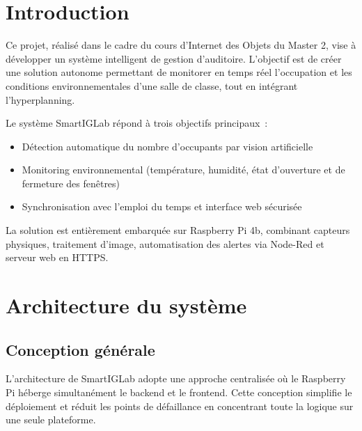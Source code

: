 \documentclass[a4paper,12pt]{report}
\begin{document}
\umonsCoverPage

\cleardoublepage
{}
\vspace{1cm}

\vspace{2cm}
\noindent


\tableofcontents
\newpage

\section{Introduction}


Ce projet, réalisé dans le cadre du cours d'Internet des Objets du Master 2, vise à développer un système intelligent de gestion d'auditoire. L'objectif est de créer une solution autonome permettant de monitorer en temps réel l'occupation et les conditions environnementales d'une salle de classe, tout en intégrant l'hyperplanning.



Le système SmartIGLab répond à trois objectifs principaux~:
\begin{itemize}
    \item Détection automatique du nombre d'occupants par vision artificielle
    \item Monitoring environnemental (température, humidité, état d'ouverture et de fermeture des fenêtres)
    \item Synchronisation avec l'emploi du temps et interface web sécurisée
\end{itemize}

La solution est entièrement embarquée sur Raspberry Pi 4b, combinant capteurs physiques, traitement d'image, automatisation des alertes via Node-Red et serveur web en HTTPS.

\section{Architecture du système}

\subsection{Conception générale}


L'architecture de SmartIGLab adopte une approche centralisée où le Raspberry Pi héberge simultanément le backend et le frontend. Cette conception simplifie le déploiement et réduit les points de défaillance en concentrant toute la logique sur une seule plateforme.
\end{document}
